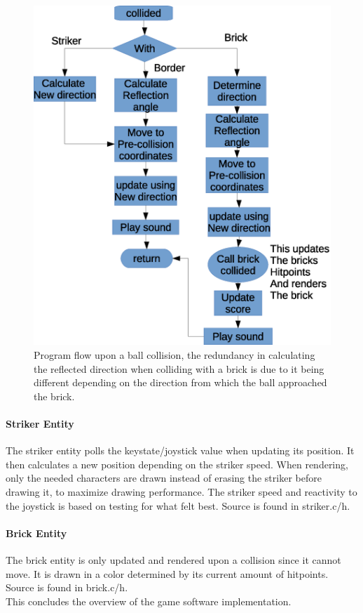 \begin{figure}
	\center
	\includegraphics[scale=0.5]{pictures/ball_flow.eps}
	\caption{Program flow upon a ball collision, the redundancy in calculating the reflected
	direction when colliding with a brick is due to it being different depending on the direction
	from which the ball approached the brick.}
	\label{ball_flow}
\end{figure}

\paragraph{Striker Entity}
The striker entity polls the keystate/joystick value when updating its position. It then 
calculates a new position depending on the striker speed. When rendering, only the needed
characters are drawn instead of erasing the striker before drawing it, to maximize drawing
performance. The striker speed and reactivity to the joystick is based on testing for
what felt best. Source is found in striker.c/h.

\paragraph{Brick Entity}
The brick entity is only updated and rendered upon a collision since it cannot move. It is
drawn in a color determined by its current amount of hitpoints. Source is found in brick.c/h. \\

This concludes the overview of the game software implementation.
